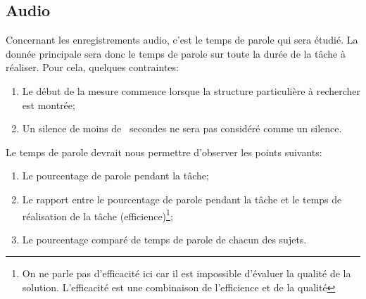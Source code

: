 \documentclass[a4paper,fleqn]{report}
\begin{document}
			\subsection{Audio}
				Concernant les enregistrements audio, c'est le temps de parole qui sera étudié.
				La donnée principale sera donc le temps de parole sur toute la durée de la tâche à réaliser.
				Pour cela, quelques contraintes:
				\begin{enumerate}
					\item Le début de la mesure commence lorsque la structure particulière à rechercher est montrée;
					\item Un silence de moins de ~secondes ne sera pas considéré comme un silence.
				\end{enumerate}
				Le temps de parole devrait nous permettre d'observer les points suivants:
				\begin{enumerate}
					\item Le pourcentage de parole pendant la tâche;
					\item Le rapport entre le pourcentage de parole pendant la tâche et le temps de réalisation de la tâche (efficience)\footnote{On ne parle pas d'efficacité ici car il est impossible d'évaluer la qualité de la solution. L'efficacité est une combinaison de l'efficience et de la qualité};
					\item Le pourcentage comparé de temps de parole de chacun des sujets.
				\end{enumerate}
\end{document}
